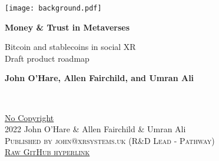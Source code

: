 \documentclass[
	12pt, %
	fleqn, %
	a4paper, %
	oneside, %
]{LegrandOrangeBook}
\begin{document}

\titlepage %
	{\texttt{[image: background.pdf]}} %
	{ %
		\centering\sffamily %
		{\Huge\bfseries Money \& Trust in Metaverses\par} %
		\vspace{16pt} %
		{\LARGE Bitcoin and stablecoins in  social XR\\Draft product roadmap\par}  %
		\vspace{24pt} %
		{\large \textbf{John O'Hare, Allen Fairchild, and Umran Ali}\par} %
	}


\thispagestyle{empty} %

~\vfill %

\noindent \href{https://creativecommons.org/publicdomain/zero/1.0/}{No Copyright}\\ 2022 John O'Hare \& Allen Fairchild \& Umran Ali\\ %

\noindent \textsc{Published by john@xrsystems.uk (R\&D Lead - Pathway)}\\ %

\noindent \textsc{\href{https://github.com/flossverse/origin/blob/draft/Book/metaverseBTC.pdf}{Raw GitHub hyperlink}}\\ %
\end{document}
